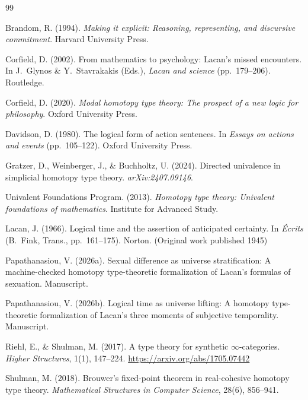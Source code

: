 \documentclass[12pt]{article}
\theoremstyle{definition}
\theoremstyle{remark}
\begin{document}
\begin{thebibliography}{99}

Brandom, R. (1994). \textit{Making it explicit: Reasoning, representing, and discursive commitment}. Harvard University Press.

Corfield, D. (2002). From mathematics to psychology: Lacan's missed encounters. In J.~Glynos \& Y.~Stavrakakis (Eds.), \textit{Lacan and science} (pp.~179--206). Routledge.

Corfield, D. (2020). \textit{Modal homotopy type theory: The prospect of a new logic for philosophy}. Oxford University Press.

Davidson, D. (1980). The logical form of action sentences. In \textit{Essays on actions and events} (pp.~105--122). Oxford University Press.

Gratzer, D., Weinberger, J., \& Buchholtz, U. (2024). Directed univalence in simplicial homotopy type theory. \textit{arXiv:2407.09146}.

Univalent Foundations Program. (2013). \textit{Homotopy type theory: Univalent foundations of mathematics}. Institute for Advanced Study.

Lacan, J. (1966). Logical time and the assertion of anticipated certainty. In \textit{\'{E}crits} (B.~Fink, Trans., pp.~161--175). Norton. (Original work published 1945)

Papathanasiou, V. (2026a). Sexual difference as universe stratification: A machine-checked homotopy type-theoretic formalization of Lacan's formulas of sexuation. Manuscript.

Papathanasiou, V. (2026b). Logical time as universe lifting: A homotopy type-theoretic formalization of Lacan's three moments of subjective temporality. Manuscript.

Riehl, E., \& Shulman, M. (2017). A type theory for synthetic $\infty$-categories. \textit{Higher Structures}, 1(1), 147--224. \url{https://arxiv.org/abs/1705.07442}

Shulman, M. (2018). Brouwer's fixed-point theorem in real-cohesive homotopy type theory. \textit{Mathematical Structures in Computer Science}, 28(6), 856--941.

\end{thebibliography}
\end{document}
